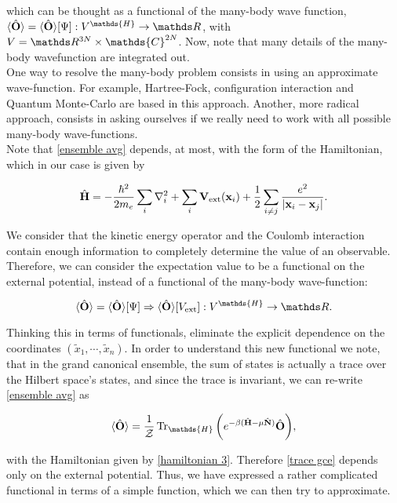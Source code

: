 \documentclass{homework}
\begin{document}
which can be thought as a functional of the many-body wave function, $\langle \hat{\bf O} \rangle = \langle \hat{\bf O} \rangle[\Psi]: {V}^{\mathds{H}} \rightarrow \R$, with $V = \R^{3N} \times \mathds {C}^{2N}$. Now, note that many details of the many-body wavefunction are integrated out. \\

One way to resolve the many-body problem consists in using an approximate wave-function. For example, Hartree-Fock, configuration interaction and Quantum Monte-Carlo are based in this approach. Another, more radical approach, consists in asking ourselves if we really need to work with all possible many-body wave-functions. \\

Note that \eqref{ensemble avg} depends, at most, with the form of the Hamiltonian, which in our case is given by 
 
\begin{equation}
    \hat{\bf H} = -\frac{\hbar^2}{2m_e} \sum_i \nabla^2_i + \sum_{i} {\bf V}_{\textnormal{ext}} ({\bf x}_i) + \frac{1}{2} \sum_{i \neq j} \frac{e^2}{|{\bf x}_i-{\bf x}_j|}.
\label{hamiltonian 3}
\end{equation}

We consider that the kinetic energy operator and the Coulomb interaction contain enough information to completely determine the value of an observable. Therefore, we can consider the expectation value to be a functional on the external potential, instead of a functional of the many-body wave-function:

$$
\langle \hat{\bf O} \rangle = \langle \hat{\bf O}  \rangle[\Psi] \Rightarrow
\langle \hat{\bf O}  \rangle[V_{\textnormal{ext}}]
: {V}^{\mathds{H}} \rightarrow \R.
$$

Thinking this in terms of functionals, eliminate the explicit dependence on the coordinates $(\tilde{x}_1, \cdots, \tilde{x}_n)$. In order to understand this new functional we note, that in the grand canonical ensemble, the sum of states is actually a trace over the Hilbert space's states, and since the trace is invariant, we can re-write \eqref{ensemble avg} as 

\begin{equation}
    \langle \hat{\bf O} \rangle = \frac{1}{\mathcal{Z}} \Tr_{\mathds{H}} \bigg(e^{-\beta(\hat{\bf H}-\mu\hat{\bf N})} \hat{\bf O} \bigg),
\label{trace gce}
\end{equation}

with the Hamiltonian given by \eqref{hamiltonian 3}. Therefore \eqref{trace gce} depends only on the external potential. Thus, we have expressed a rather complicated functional in terms of a simple function, which we can then try to approximate. \\
\end{document}

